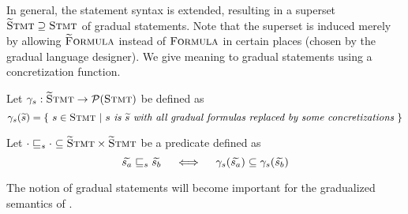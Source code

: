 In general, the statement syntax is extended, resulting in a superset $\textup{\textsc{\ensuremath{\widetilde{\text{S}}}tmt}} \supseteq \textup{\textsc{Stmt}}$ of gradual statements.
Note that the superset is induced merely by allowing $\textup{\textsc{\ensuremath{\widetilde{\text{F}}}ormula}}$ instead of $\textup{\textsc{Formula}}$ in certain places (chosen by the gradual language designer).
We give meaning to gradual statements using a concretization function. %
\begin{definition}
    Let $\gamma_s : \textup{\textsc{\ensuremath{\widetilde{\text{S}}}tmt}} \rightarrow \mathcal{P}(\textup{\textsc{Stmt}})$ be defined as
    \begin{displaymath}
    \gamma_s(\widetilde{s}) = \{~ s \in \textup{\textsc{Stmt}} ~|~ \textit{$s$ is $\widetilde{s}$ with all gradual formulas replaced by some concretizations} ~\}
    \end{displaymath}
\end{definition}
\begin{definition}
    Let $\cdot \sqsubseteq_s \cdot \subseteq \textup{\textsc{\ensuremath{\widetilde{\text{S}}}tmt}} \times \textup{\textsc{\ensuremath{\widetilde{\text{S}}}tmt}}$ be a predicate defined as
    $$\widetilde{s_a} \sqsubseteq_s \widetilde{s_b}  \quad\iff\quad  \gamma_s(\widetilde{s_a}) \subseteq \gamma_s(\widetilde{s_b})$$
\end{definition}

The notion of gradual statements will become important for the gradualized semantics of \gvl.
